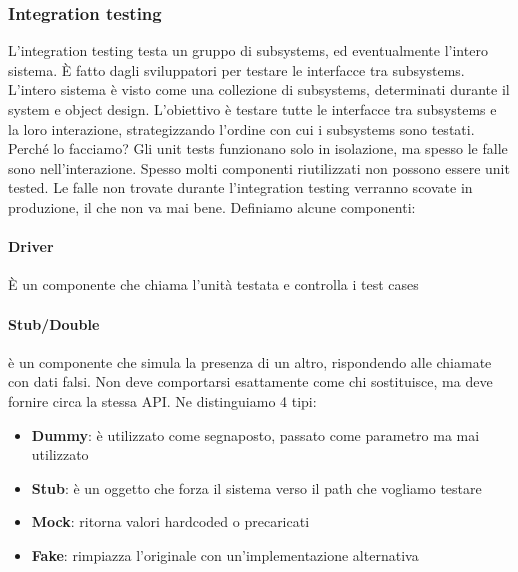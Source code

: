 \documentclass[11pt]{article}
\begin{document}
\subsubsection{Integration testing}
L'integration testing testa un gruppo di subsystems, ed eventualmente l'intero sistema. È fatto dagli sviluppatori per testare le interfacce tra subsystems. L'intero sistema è visto come una collezione di subsystems, determinati durante il system e object design. L'obiettivo è testare tutte le interfacce tra subsystems e la loro interazione, strategizzando l'ordine con cui i subsystems sono testati. Perché lo facciamo? Gli unit tests funzionano solo in isolazione, ma spesso le falle sono nell'interazione. Spesso molti componenti riutilizzati non possono essere unit tested. Le falle non trovate durante l'integration testing verranno scovate in produzione, il che non va mai bene.
Definiamo alcune componenti:
\paragraph{Driver} È un componente che chiama l'unità testata e controlla i test cases 
\paragraph{Stub/Double} è un componente che simula la presenza di un altro, rispondendo alle chiamate con dati falsi. Non deve comportarsi esattamente come chi sostituisce, ma deve fornire circa la stessa API. Ne distinguiamo 4 tipi: 
\begin{itemize}
    \item \textbf{Dummy}: è utilizzato come segnaposto, passato come parametro ma mai utilizzato 
    \item \textbf{Stub}: è un oggetto che forza il sistema verso il path che vogliamo testare
    \item \textbf{Mock}: ritorna valori hardcoded o precaricati 
    \item \textbf{Fake}: rimpiazza l'originale con un'implementazione alternativa 
\end{itemize}
\end{document}
